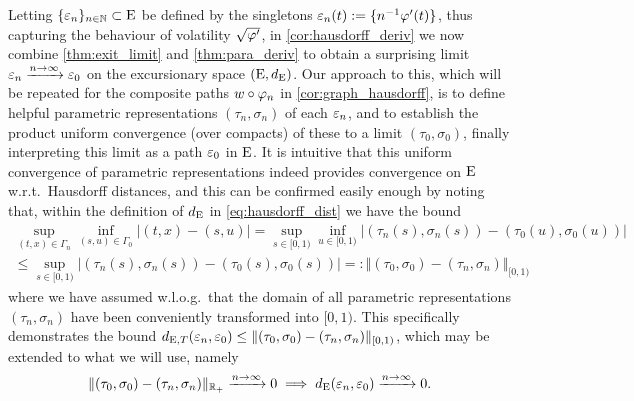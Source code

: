 Letting $\{\varepsilon_n\}_{n\in\mathbb{N}}\subset\mathrm{E}$ be defined by the singletons $\varepsilon_n(t):=\{n^{-1}\varphi'(t)\}$, thus capturing the behaviour of volatility $\sqrt{\varphi'}$, in \autoref{cor:hausdorff_deriv} we now combine \autoref{thm:exit_limit} and \autoref{thm:para_deriv} to obtain a surprising limit $\varepsilon_n\xrightarrow{n\to\infty}\varepsilon_0$ on the excursionary space $(\mathrm{E},d_{\mathrm{E}})$. Our approach to this, which will be repeated for the composite paths $w\circ\varphi_n$ in \autoref{cor:graph_hausdorff}, is to define helpful parametric representations $(\tau_n,\sigma_n)$ of each $\varepsilon_n$, and to establish the product uniform convergence (over compacts) of these to a limit $(\tau_0,\sigma_0)$, finally interpreting this limit as a path $\varepsilon_0$ in $\mathrm{E}$. It is intuitive that this uniform convergence of parametric representations indeed provides convergence on $\mathrm{E}$ w.r.t.~Hausdorff distances, and this can be confirmed easily enough by noting that, within the definition of $d_{\mathrm{E}}$ in \autoref{eq:hausdorff_dist} we have the bound
\begin{multline}
    \sup_{(t,x)\in\Gamma_n}\inf_{(s,u)\in\Gamma_0} |(t,x) - (s,u)| = \sup_{s\in[0,1)}\inf_{u\in[0,1)} |(\tau_n(s),\sigma_n(s)) - (\tau_0(u),\sigma_0(u))|\\
    \le \sup_{s\in[0,1)} |(\tau_n(s),\sigma_n(s)) - (\tau_0(s),\sigma_0(s))| =: \Vert(\tau_0,\sigma_0) - (\tau_n,\sigma_n)\Vert_{[0,1)}
\end{multline}
where we have assumed w.l.o.g.~that the domain of all parametric representations $(\tau_n,\sigma_n)$ have been conveniently transformed into $[0,1)$. This specifically demonstrates the bound $d_{\mathrm{E},T}(\varepsilon_n,\varepsilon_0)\le \Vert(\tau_0,\sigma_0) - (\tau_n,\sigma_n)\Vert_{[0,1)}$, which may be extended to what we will use, namely~
\begin{equation}\label{eq:para_limit_to_excursion}
    \Vert(\tau_0,\sigma_0) - (\tau_n,\sigma_n)\Vert_{\mathbb{R}_+}\xrightarrow{n\to\infty}0 \implies d_{\mathrm{E}}(\varepsilon_n,\varepsilon_0)\xrightarrow{n\to\infty}0.
\end{equation}


